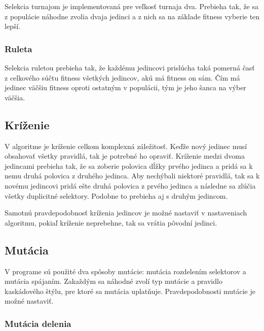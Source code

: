 Selekcia turnajom je implementovaná pre veľkosť turnaja dva. Prebieha tak, že sa z populácie náhodne zvolia dvaja jedinci a z nich sa na základe fitness vyberie ten lepší.


\subsubsection{Ruleta} %
\label{ssub:ruleta}

Selekcia ruletou prebieha tak, že každému jedincovi prislúcha taká pomerná časť z celkového súčtu fitness všetkých jedincov, akú má fitness on sám. Čím má jedinec väčšiu fitness oproti ostatným v populácii, tým je jeho šanca na výber väčšia.



\subsection{Kríženie} %
\label{sub:kr_enie}

V algoritme je kríženie celkom komplexná záležitosť. Keďže nový jedinec musí obsahovať všetky pravidlá, tak je potrebné ho opraviť. Kríženie medzi dvoma jedincami prebieha tak, že sa zoberie polovica dĺžky prvého jedinca a pridá sa k nemu druhá polovica z druhého jedinca. Aby nechýbali niektoré pravidlá, tak sa k novému jedincovi pridá ešte druhá polovica z prvého jedinca a následne sa zlúčia všetky duplicitné selektory. Podobne to prebieha aj s druhým jedincom.

Samotnú pravdepodobnosť kríženia jedincov je možné nastaviť v nastaveniach algoritmu, pokiaľ kríženie neprebehne, tak sa vrátia pôvodní jedinci.


\subsection{Mutácia} %
\label{sub:mut_cia}

V programe sú použité dva spôsoby mutácie: mutácia rozdelením selektorov a mutácia spájaním. Zakaždým sa náhodné zvolí typ mutácie a pravidlo kaskádového štýlu, pre ktoré sa mutácia uplatňuje. Pravdepodobnosti mutácie je možné nastaviť.

\subsubsection{Mutácia delenia} %
\label{ssub:rozdelenie}

